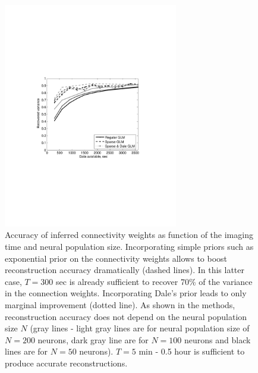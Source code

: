 \begin{figure}[h]
\centering
\includegraphics[width=3in]{../figs/FigureA7_recvar_NT}
\caption{Accuracy of inferred connectivity weights as function of the imaging time and neural population size. 
Incorporating simple priors such as exponential prior on the connectivity weights allows to boost reconstruction accuracy dramatically (dashed lines). In this latter case, $T=300$ sec is already sufficient to recover 70\% of the variance in the connection weights. Incorporating Dale's prior leads to only marginal improvement (dotted line). As shown in the methods, reconstruction accuracy does not depend on the neural population size $N$ (gray lines - light gray lines are for neural population size of $N=200$ neurons, dark gray line are for $N=100$ neurons and black lines are for $N=50$ neurons).
$T=5$ min - 0.5 hour is sufficient to produce accurate reconstructions.
}
\label{fig:recvar-NT}
\end{figure}


